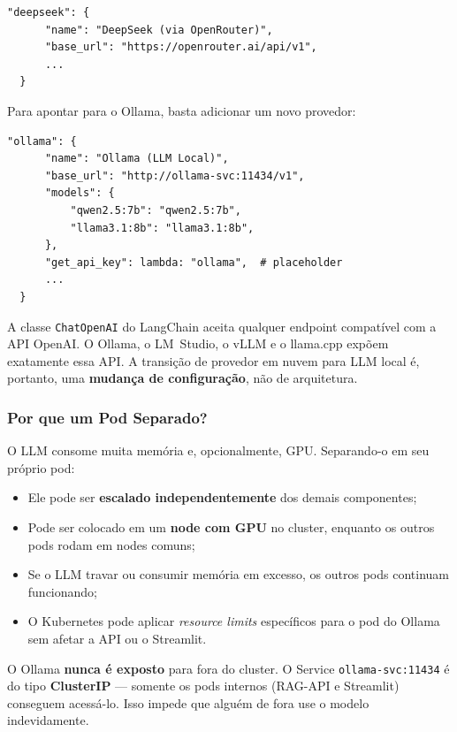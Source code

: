 \documentclass[12pt, a4paper]{article}
\begin{document}
\begin{lstlisting}[caption={Configuração atual em config.py --- DeepSeek via OpenRouter}, label=lst:config_atual]
  "deepseek": {
      "name": "DeepSeek (via OpenRouter)",
      "base_url": "https://openrouter.ai/api/v1",
      ...
  }
\end{lstlisting}

Para apontar para o Ollama, basta adicionar um novo provedor:

\begin{lstlisting}[caption={Configuração para Ollama --- mudança de URL apenas}, label=lst:config_ollama]
  "ollama": {
      "name": "Ollama (LLM Local)",
      "base_url": "http://ollama-svc:11434/v1",
      "models": {
          "qwen2.5:7b": "qwen2.5:7b",
          "llama3.1:8b": "llama3.1:8b",
      },
      "get_api_key": lambda: "ollama",  # placeholder
      ...
  }
\end{lstlisting}

A classe \texttt{ChatOpenAI} do LangChain aceita qualquer endpoint compatível com a API OpenAI. O Ollama, o LM~Studio, o vLLM e o llama.cpp expõem exatamente essa API. A transição de provedor em nuvem para LLM local é, portanto, uma \textbf{mudança de configuração}, não de arquitetura.

\subsubsection*{Por que um Pod Separado?}

O LLM consome muita memória e, opcionalmente, GPU. Separando-o em seu próprio pod:

\begin{itemize}
  \item Ele pode ser \textbf{escalado independentemente} dos demais componentes;
  \item Pode ser colocado em um \textbf{node com GPU} no cluster, enquanto os outros pods rodam em nodes comuns;
  \item Se o LLM travar ou consumir memória em excesso, os outros pods continuam funcionando;
  \item O Kubernetes pode aplicar \textit{resource limits} específicos para o pod do Ollama sem afetar a API ou o Streamlit.
\end{itemize}

O Ollama \textbf{nunca é exposto} para fora do cluster. O Service \texttt{ollama-svc:11434} é do tipo \textbf{ClusterIP} --- somente os pods internos (RAG-API e Streamlit) conseguem acessá-lo. Isso impede que alguém de fora use o modelo indevidamente.
\end{document}
